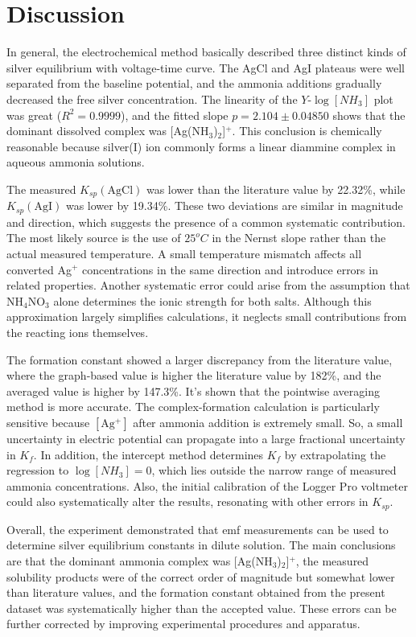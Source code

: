 \documentclass[12pt]{article}
\begin{document}
\section*{Discussion}
In general, the electrochemical method basically described three distinct kinds of silver equilibrium with voltage-time curve. The AgCl and AgI plateaus were well separated from the baseline potential, and the ammonia additions gradually decreased the free silver concentration. The linearity of the $Y$-$\log[NH_3]$ plot was great ($R^2=0.9999$), and the fitted slope $p=2.104\pm0.04850$ shows that the dominant dissolved complex was [Ag(NH$_3$)$_2$]$^+$. This conclusion is chemically reasonable because silver(I) ion commonly forms a linear diammine complex in aqueous ammonia solutions.

The measured $K_{sp}(\mathrm{AgCl})$ was lower than the literature value by 22.32\%, while $K_{sp}(\mathrm{AgI})$ was lower by 19.34\%. These two deviations are similar in magnitude and direction, which suggests the presence of a common systematic contribution. The most likely source is the use of $25 ^oC$ in the Nernst slope rather than the actual measured temperature. A small temperature mismatch affects all converted Ag$^+$ concentrations in the same direction and introduce errors in related properties. Another systematic error could arise from the assumption that NH$_4$NO$_3$ alone determines the ionic strength for both salts. Although this approximation largely simplifies calculations, it neglects small contributions from the reacting ions themselves.

The formation constant showed a larger discrepancy from the literature value, where the graph-based value is higher the literature value by 182\%, and the averaged value is higher by 147.3\%. It's shown that the pointwise averaging method is more accurate. The complex-formation calculation is particularly sensitive because $[\mathrm{Ag^+}]$ after ammonia addition is extremely small. So, a small uncertainty in electric potential can propagate into a large fractional uncertainty in $K_f$. In addition, the intercept method determines $K_f$ by extrapolating the regression to $\log[NH_3]=0$, which lies outside the narrow range of measured ammonia concentrations. Also, the initial calibration of the Logger Pro voltmeter could also systematically alter the results, resonating with other errors in $K_{sp}$.

Overall, the experiment demonstrated that emf measurements can be used to determine silver equilibrium constants in dilute solution. The main conclusions are that the dominant ammonia complex was [Ag(NH$_3$)$_2$]$^+$, the measured solubility products were of the correct order of magnitude but somewhat lower than literature values, and the formation constant obtained from the present dataset was systematically higher than the accepted value. These errors can be further corrected by improving experimental procedures and apparatus. 
\end{document}

